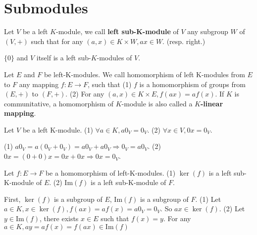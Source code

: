 \documentclass{book}
\numberwithin{equation}{section}
\begin{document}
\section{Submodules}
\begin{definitionenv}
    Let $V$ be a left $K$-module, we call \textbf{left sub-K-module} of $V$ any subgroup $W$ of $(V,+)$ such that for any $(a,x)\in K\times W,ax\in W$. (resp. right.)
\end{definitionenv}
\begin{exampleenv}
    $\{0\}$ and $V$ itself is a left sub-$K$-modules of $V$.
\end{exampleenv}
\begin{definitionenv}
    Let $E$ and $F$ be left-K-modules. We call homomorphism of left K-modules from $E$ to $F$ any mapping $f:E\rightarrow F$, such that 
    \newline
    (1) $f$ is a homomorphism of groups from $(E,+)$ to $(F,+)$.
    \newline
    (2) For any $(a,x)\in K\times E,f(ax)=af(x)$.
    \newline
    If $K$ is communitative, a homomorphism of $K$-module is also called a \textbf{$K$-linear mapping}.
\end{definitionenv}
\begin{lemmaenv}
    Let $V$ be a left K-module.
    \newline
    (1) $\forall a\in K,a0_V=0_V$.
    \newline
    (2) $\forall x\in V,0x=0_V$.
\end{lemmaenv}
\begin{proofenv}
    \quad
    \newline
    (1) $a0_V=a(0_V+0_V)=a0_V+a0_V\Rightarrow 0_V=a0_V$.
    \newline
    (2) $0x=(0+0)x=0x+0x\Rightarrow 0x=0_V$.
\end{proofenv}
\begin{theoremenv}
    Let $f:E\rightarrow F$ be a homomorphism of left-K-modules.
    \newline 
    (1) $\ker(f)$ is a left sub-K-module of $E$.
    \newline
    (2) $\mathrm{Im}(f)$ is a left sub-K-module of $F$. 
\end{theoremenv}
\begin{proofenv}
    First, $\ker(f)$ is a subgroup of $E$, $\mathrm{Im}(f)$ is a subgroup of $F$.
    \newline
    (1) Let $a\in K, x\in \ker(f), f(ax)=af(x)=a0_V=0_V$. So $ax\in \ker(f)$.
    \newline
    (2) Let $y\in \mathrm{Im}(f)$, there exists $x\in E$ such that $f(x)=y$. For any $a\in K,ay=af(x)=f(ax)\in \mathrm{Im}(f)$
\end{proofenv}
\end{document}
